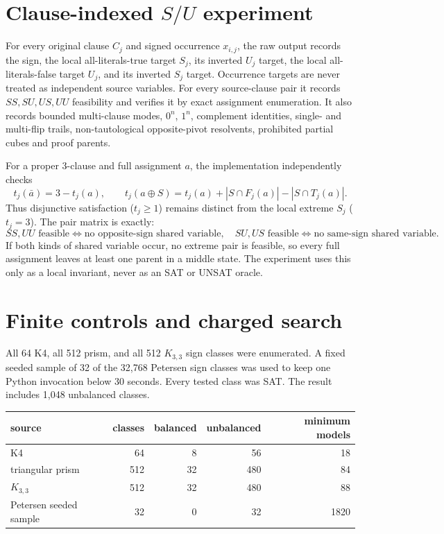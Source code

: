 \documentclass[11pt]{article}
\begin{document}
\section{Clause-indexed $S/U$ experiment}

For every original clause $C_j$ and signed occurrence $x_{i,j}$, the raw
output records the sign, the local all-literals-true target $S_j$, its inverted
$U_j$ target, the local all-literals-false target $U_j$, and its inverted
$S_j$ target.  Occurrence targets are never treated as independent source
variables.  For every source-clause pair it records $SS,SU,US,UU$ feasibility
and verifies it by exact assignment enumeration.  It also records bounded
multi-clause modes, $0^n$, $1^n$, complement identities, single- and
multi-flip trails, non-tautological opposite-pivot resolvents, prohibited
partial cubes and proof parents.

For a proper 3-clause and full assignment $a$, the implementation independently
checks
\[
 t_j(\bar a)=3-t_j(a),\qquad
 t_j(a\oplus S)=t_j(a)+|S\cap F_j(a)|-|S\cap T_j(a)|.
\]
Thus disjunctive satisfaction ($t_j\ge1$) remains distinct from the local
extreme $S_j$ ($t_j=3$).  The pair matrix is exactly:
\[
 SS,UU\text{ feasible}\iff\text{no opposite-sign shared variable},
\quad
 SU,US\text{ feasible}\iff\text{no same-sign shared variable}.
\]
If both kinds of shared variable occur, no extreme pair is feasible, so every
full assignment leaves at least one parent in a middle state.  The experiment
uses this only as a local invariant, never as an SAT or UNSAT oracle.

\section{Finite controls and charged search}

All 64 K4, all 512 prism, and all 512 $K_{3,3}$ sign classes were enumerated.
A fixed seeded sample of 32 of the 32,768 Petersen sign classes was used to
keep one Python invocation below 30 seconds.  Every tested class was SAT.
The result includes 1,048 unbalanced classes.

\begin{center}
\begin{tabular}{lrrrr}
\toprule
source & classes & balanced & unbalanced & minimum models\\
\midrule
K4 & 64 & 8 & 56 & 18\\
triangular prism & 512 & 32 & 480 & 84\\
$K_{3,3}$ & 512 & 32 & 480 & 88\\
Petersen seeded sample & 32 & 0 & 32 & 1820\\
\bottomrule
\end{tabular}
\end{center}
\end{document}
